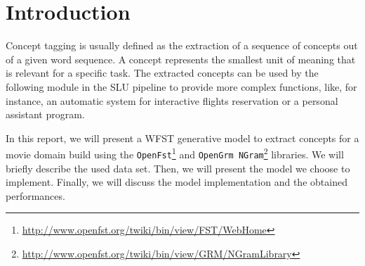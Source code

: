 \section{Introduction}
\label{sec:introduction}

Concept tagging is usually defined as the extraction of a sequence of concepts out of a given word sequence.
A concept represents the smallest unit of meaning that is relevant for a specific task.
The extracted concepts can be used by the following module in the \ac{SLU} pipeline to provide more complex functions,
like, for instance, an automatic system for interactive flights reservation or a personal assistant program.

In this report, we will present a \ac{WFST} generative model to extract concepts for a movie domain build using
the \texttt{OpenFst}\footnote{\url{http://www.openfst.org/twiki/bin/view/FST/WebHome}}
and \texttt{OpenGrm NGram}\footnote{\url{http://www.openfst.org/twiki/bin/view/GRM/NGramLibrary}} libraries.
We will briefly describe the used data set.
Then, we will present the model we choose to implement.
Finally, we will discuss the model implementation and the obtained performances.
